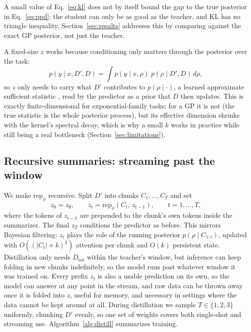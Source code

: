 \documentclass{article}
\newcommand{\Dtot}{D_{\mathrm{tot}}}
\newcommand{\Dfar}{D'}
\newcommand{\Dloc}{D}
\newcommand{\rep}{\mathrm{rep}}
\begin{document}
A small value of Eq.~\eqref{eq:kl} does not by itself bound the gap to the
true posterior in Eq.~\eqref{eq:ppd}: the student can only be as good as
the teacher, and KL has no triangle inequality. Section~\ref{sec:results}
addresses this by comparing against the exact GP posterior, not just the
teacher.

A fixed-size $z$ works because conditioning only matters through the
posterior over the task:
\begin{equation}
  p(y \mid x, \Dfar, \Dloc)
  = \int p(y \mid x, \rho)\; p(\rho \mid \Dfar, \Dloc)\, d\rho ,
\end{equation}
so $z$ only needs to carry what $\Dfar$ contributes to $p(\rho \mid \cdot)$,
a learned approximate sufficient statistic \citep{chen2021nass}, read
by the predictor as a prior that $\Dloc$ then updates. This is exactly
finite-dimensional for exponential-family tasks; for a GP it is not (the
true statistic is the whole posterior process), but its effective dimension
shrinks with the kernel's spectral decay, which is why a small $k$ works in
practice while still being a real bottleneck (Section~\ref{sec:limitations}).

\subsection{Recursive summaries: streaming past the window}
\label{sec:recursive}

We make $\rep_\phi$ recursive. Split $\Dfar$ into chunks
$C_1, \dots, C_T$ and set
\begin{equation}
\label{eq:recursion}
  z_0 = z_\emptyset, \qquad
  z_t = \rep_\phi(C_t,\, z_{t-1}), \qquad t = 1, \dots, T,
\end{equation}
where the tokens of $z_{t-1}$ are prepended to the chunk's own tokens
inside the summarizer. The final $z_T$ conditions the predictor as before.
This mirrors Bayesian filtering: $z_t$ plays the role of the running
posterior $p(\rho \mid C_{1:t})$, updated with $O((|C_t| + k)^2)$ attention
per chunk and $O(k)$ persistent state. Distillation only needs $\Dtot$
within the teacher's window, but inference can keep folding in new chunks
indefinitely, so the model runs past whatever window it was trained on.
Every prefix $z_t$ is also a usable prediction on its own, so the model can
answer at any point in the stream, and raw data can be thrown away once
it is folded into $z$, useful for memory, and necessary in settings
where the data cannot be kept around at all. During distillation we sample
$T \in \{1,2,3\}$ uniformly, chunking $\Dfar$ evenly, so one set of weights
covers both single-shot and streaming use. Algorithm~\ref{alg:distill}
summarizes training.
\end{document}
